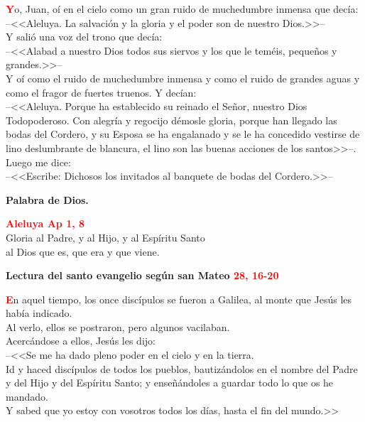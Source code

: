 \documentclass[12pt, letterpaper]{report}
\begin{document}
  \Large \lettrine[lines=2]{\bfseries \textcolor{red}{Y}}{}\Large o, Juan, o\'i en el cielo como un gran ruido de muchedumbre inmensa que dec\'ia: \\
  --<<Aleluya. La salvaci\'on y la gloria y el poder son de nuestro Dios.>>-- \\
  Y sali\'o una voz del trono que dec\'ia: \\
  --<<Alabad a nuestro Dios todos sus siervos y los que le tem\'eis, peque\~nos y grandes.>>-- \\
  Y o\'i como el ruido de muchedumbre inmensa y como el ruido de grandes aguas y
  como el fragor de fuertes truenos. Y dec\'ian: \\
  --<<Aleluya. Porque ha establecido su reinado el Se\~nor, nuestro Dios \\ Todopoderoso.
  Con alegr\'ia y regocijo d\'emosle gloria, porque han llegado las bodas del Cordero,
  y su Esposa se ha engalanado y se le ha concedido vestirse de lino deslumbrante de blancura, el
  lino son las buenas acciones de los santos>>--. \\
  Luego me dice: \\
  --<<Escribe: Dichosos los invitados al banquete de bodas del Cordero.>>--

  {\bfseries Palabra de Dios.}

  \begin{center}
    \Large {\bfseries \textcolor{red}{Aleluya \hspace{1cm} Ap 1, 8}} \\
    Gloria al Padre, y al Hijo, y al Esp\'iritu Santo \\
    al Dios que es, que era y que viene.
  \end{center}

  \clearpage

  \Huge \textcolor{red}{} \Large {\bfseries Lectura del santo evangelio seg\'un san Mateo \hspace{1cm} \textcolor{red}{28, 16-20}}

  \Large \lettrine[lines=2]{\bfseries \textcolor{red}{E}}{}\Large n aquel tiempo, los once disc\'ipulos se fueron a Galilea, al monte que Jes\'us les
  hab\'ia indicado.\\
  Al verlo, ellos se postraron, pero algunos vacilaban.\\
  Acerc\'andose a ellos, Jes\'us les dijo:\\
  --<<Se me ha dado pleno poder en el cielo y en la tierra.\\
  Id y haced disc\'ipulos de todos los pueblos, bautiz\'andolos en el nombre del Padre y del Hijo y del Esp\'iritu Santo; y ense\~n\'andoles a guardar todo lo que os he mandado.\\
  Y sabed que yo estoy con vosotros todos los d\'ias, hasta el fin del mundo.>>
\end{document}
